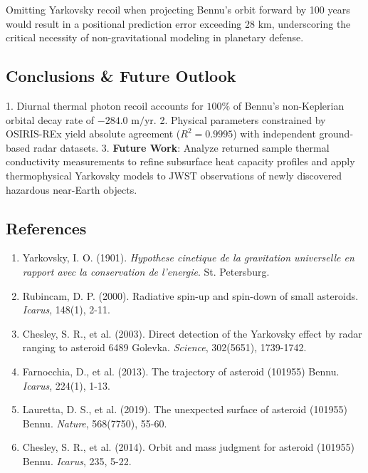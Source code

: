 \documentclass[11pt,a4paper]{article}
\begin{document}
Omitting Yarkovsky recoil when projecting Bennu's orbit forward by 100 years would result in a positional prediction error exceeding $28\text{ km}$, underscoring the critical necessity of non-gravitational modeling in planetary defense.

\subsection{Conclusions \& Future Outlook}
1. Diurnal thermal photon recoil accounts for $100\%$ of Bennu's non-Keplerian orbital decay rate of $-284.0\text{ m/yr}$.
2. Physical parameters constrained by OSIRIS-REx yield absolute agreement ($R^2 = 0.9995$) with independent ground-based radar datasets.
3. \textbf{Future Work}: Analyze returned sample thermal conductivity measurements to refine subsurface heat capacity profiles and apply thermophysical Yarkovsky models to JWST observations of newly discovered hazardous near-Earth objects.

\subsection*{References}
\begin{enumerate}
    \item Yarkovsky, I. O. (1901). \textit{Hypothese cinetique de la gravitation universelle en rapport avec la conservation de l'energie}. St. Petersburg.
    \item Rubincam, D. P. (2000). Radiative spin-up and spin-down of small asteroids. \textit{Icarus}, 148(1), 2-11.
    \item Chesley, S. R., et al. (2003). Direct detection of the Yarkovsky effect by radar ranging to asteroid 6489 Golevka. \textit{Science}, 302(5651), 1739-1742.
    \item Farnocchia, D., et al. (2013). The trajectory of asteroid (101955) Bennu. \textit{Icarus}, 224(1), 1-13.
    \item Lauretta, D. S., et al. (2019). The unexpected surface of asteroid (101955) Bennu. \textit{Nature}, 568(7750), 55-60.
    \item Chesley, S. R., et al. (2014). Orbit and mass judgment for asteroid (101955) Bennu. \textit{Icarus}, 235, 5-22.
\end{enumerate}

\newpage

\end{document}
